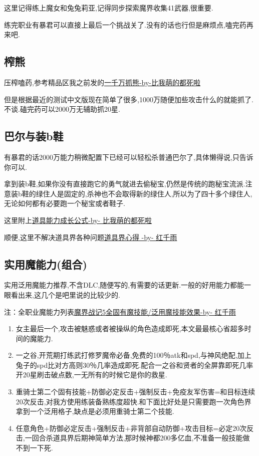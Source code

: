 		这里记得练上魔女和兔兔莉亚,记得同步探索魔界收集41武器,很重要.

		练完职业有暴君可以直接上最后一个挑战关了.没有的话也行但是麻烦点,嗑完药再来吧.

	\subsection{榨熊}

	压榨嗑药,参考精品区我之前发的\href{http://tieba.baidu.com/p/3825275063}{一千万抓熊-by-比我萌的都死啦}

	但是根据最近的测试中文版现在简单了很多,1000万随便加些攻击什么的就能抓了.不谈.磕完药可以2000万无辅助抓20星.
		

	\subsection{巴尔与装b鞋}

	有暴君的话2000万能力稍微配置下已经可以轻松杀普通巴尔了,具体懒得说,只告诉你可以.

	拿到装b鞋,如果你没有直接跑它的勇气就进去偷秘宝,仍然是传统的跑秘宝流派.注意装b鞋的绿住人是固定的,杀神也不会取得新的绿住人,所以为了四十多个绿住人,无论如何都有必要跑一个秘宝或者鞋子.

	这里附上\href{http://tieba.baidu.com/f?kz=3834692385}{道具能力成长公式-by- 比我萌的都死啦}

	顺便,这里不解决道具界各种问题\href{http://tieba.baidu.com/p/3730196003}{道具界心得 -by- 红千雨}

	\subsection{实用魔能力(组合)}

	实用泛用魔能力推荐,不含DLC,随便写的,有需要的话更新.一般的好用能力都能一眼看出来,这几个是吧里说的比较少的.

	注：全职业魔能力列表\href{http://tieba.baidu.com/p/3765501530}{魔界战记5全固有魔技能/泛用魔技能效果-by- 红千雨}

	\begin{enumerate}
		\item
		女主最后一个,攻击被魅惑或者被操纵的角色造成即死,本文最最核心省超多时间的魔能力.
		\item
		一之谷,开荒期打练武打修罗魔帝必备,免费的100％atk和spd,与神风绝配,加上兔子的spd比对方高则30％几率造成即死.配合一之谷和贤者的全屏靠即死几率开20星刷击破点数,一无所有的时候它是你的救星.
		\item
		重骑士第二个固有技能+防御必定反击+强制反击+免疫友军伤害=和目标连续20次反击,对我方使用练装备熟练度超快.和下面比好处是只需要跑一次角色界拿到一个泛用格子,缺点是必须用重骑士第二个技能.
		\item
		任意角色+防御必定反击+强制反击+非背部自动防御+攻击目标=必定20次反击,一回合杀道具界后期神简单方法,那时候神都200多亿血,不准备一般技能做不到一下死.
	\end{enumerate}


